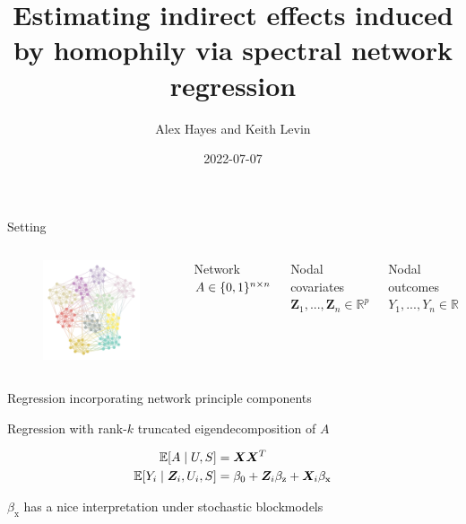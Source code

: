 \documentclass{beamer}
\title{Estimating indirect effects induced by homophily via spectral network regression}
\date{2022-07-07}
\author{Alex Hayes and Keith Levin}
\institute{University of Wisconsin-Madison}
\theoremstyle{remark}
\newcommand{\X}{\bm X}
\newcommand{\Z}{\bm Z}
\newcommand \R {\mathbb{R}}
\newcommand{\betazero}{\beta_0}
\DeclarePairedDelimiter{\set}{\{}{\}}
\DeclarePairedDelimiter{\brac}{[}{]}
\newcommand{\E}[2][]{%
   \ifthenelse{ \equal{#1}{} }
      {\ensuremath{\mathbb{E} \brac*{#2}}}
      {\ensuremath{\mathbb{E} \brac*{#2 \mid #1}}}
}
\begin{document}
\maketitle

\begin{frame}{Setting}
    \begin{columns}

        \begin{figure}
            \includegraphics[width=\textwidth]{figures/assortative.png}
        \end{figure}


        Network $A \in \set{0, 1}^{n \times n}$

        Nodal covariates $\Z_1, ..., \Z_n \in \R^{p}$

        Nodal outcomes $Y_1, ..., Y_n \in \R$

    \end{columns}
\end{frame}

\begin{frame}{Regression incorporating network principle components}

    Regression with rank-$k$ truncated eigendecomposition of $A$

    \begin{align*}
        \E[U, S]{A}           & = \X \X^T                                               \\
        \E[\Z_i, U_i, S]{Y_i} & = \betazero + \Z_i \beta_\text{z} + \X_i \beta_\text{x}
    \end{align*}

    $\beta_\text{x}$ has a nice interpretation under stochastic blockmodels

\end{frame}
\end{document}
